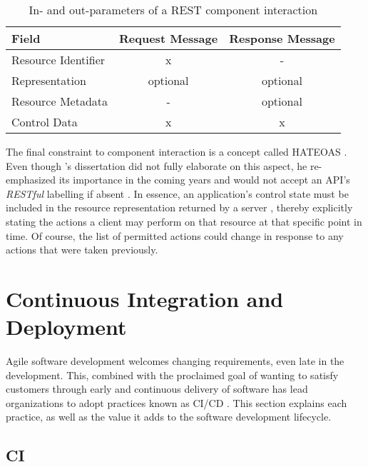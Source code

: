 \begin{appendices}
\begin{table}[hbt]
	\centering
  	\begin{tabular}{l|c|c}
	    Field & Request Message & Response Message \\
	    \hline
	    Resource Identifier 	& x & - \\
	    Representation 			& optional & optional \\
	    Resource Metadata 		& - & optional \\
	    Control Data 			& x & x \\
	\end{tabular}
  	\caption{In- and out-parameters of a \acs*{REST} component interaction}
  	\label{tab:rest-message-fields}
\end{table}

The final constraint to component interaction is a concept called \acl*{HATEOAS} \cite[p.~82]{fielding2000architectural}. Even though \citeauthor{fielding2000architectural}'s dissertation did not fully elaborate on this aspect, he re-emphasized its importance in the coming years and would not accept an \acs{API}'s \textit{\ac{REST}ful} labelling if absent \cite{fielding2008hypertext}. In essence, an application's control state must be included in the resource representation returned by a server \cite[p.~102]{fielding2000architectural}, thereby explicitly stating the actions a client may perform on that resource at that specific point in time. Of course, the list of permitted actions could change in response to any actions that were taken previously.


\section{Continuous Integration and Deployment}
\label{sec:continuous-integration-deployment}

Agile software development welcomes changing requirements, even late in the development. This, combined with the proclaimed goal of wanting to satisfy customers through early and continuous delivery of software has lead organizations to adopt practices known as \ac*{CI/CD} \cite{beck2001manifesto} \cite[p.~22]{savor2016continuous} \cite[p.~78]{virmani2015understanding}. This section explains each practice, as well as the value it adds to the software development lifecycle.


\subsection{\acl{CI}}
\label{sec:continuous-integration}


\end{appendices}
